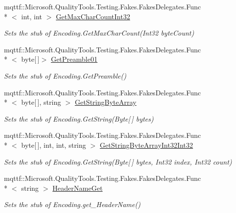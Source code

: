 \begin{DoxyCompactItemize}
mqttf\-::\-Microsoft.\-Quality\-Tools.\-Testing.\-Fakes.\-Fakes\-Delegates.\-Func\\*
$<$ int, int $>$ \hyperlink{class_system_1_1_text_1_1_fakes_1_1_stub_encoding_a3da76ffaecb1a5a18fe3c08d8bf9ca01}{Get\-Max\-Char\-Count\-Int32}
\begin{DoxyCompactList}\small\item\em Sets the stub of Encoding.\-Get\-Max\-Char\-Count(\-Int32 byte\-Count)\end{DoxyCompactList}\item 
mqttf\-::\-Microsoft.\-Quality\-Tools.\-Testing.\-Fakes.\-Fakes\-Delegates.\-Func\\*
$<$ byte\mbox{[}$\,$\mbox{]}$>$ \hyperlink{class_system_1_1_text_1_1_fakes_1_1_stub_encoding_abf888af73ec6697c5e216671d40cdae1}{Get\-Preamble01}
\begin{DoxyCompactList}\small\item\em Sets the stub of Encoding.\-Get\-Preamble()\end{DoxyCompactList}\item 
mqttf\-::\-Microsoft.\-Quality\-Tools.\-Testing.\-Fakes.\-Fakes\-Delegates.\-Func\\*
$<$ byte\mbox{[}$\,$\mbox{]}, string $>$ \hyperlink{class_system_1_1_text_1_1_fakes_1_1_stub_encoding_a08e57f47b77dc74fd63dedc5b929dc1e}{Get\-String\-Byte\-Array}
\begin{DoxyCompactList}\small\item\em Sets the stub of Encoding.\-Get\-String(\-Byte\mbox{[}$\,$\mbox{]} bytes)\end{DoxyCompactList}\item 
mqttf\-::\-Microsoft.\-Quality\-Tools.\-Testing.\-Fakes.\-Fakes\-Delegates.\-Func\\*
$<$ byte\mbox{[}$\,$\mbox{]}, int, int, string $>$ \hyperlink{class_system_1_1_text_1_1_fakes_1_1_stub_encoding_afda397423974c11f212ecbcdd58812c1}{Get\-String\-Byte\-Array\-Int32\-Int32}
\begin{DoxyCompactList}\small\item\em Sets the stub of Encoding.\-Get\-String(\-Byte\mbox{[}$\,$\mbox{]} bytes, Int32 index, Int32 count)\end{DoxyCompactList}\item 
mqttf\-::\-Microsoft.\-Quality\-Tools.\-Testing.\-Fakes.\-Fakes\-Delegates.\-Func\\*
$<$ string $>$ \hyperlink{class_system_1_1_text_1_1_fakes_1_1_stub_encoding_a43ce2beffe5ca4a9b07a07fb0e79e6b6}{Header\-Name\-Get}
\begin{DoxyCompactList}\small\item\em Sets the stub of Encoding.\-get\-\_\-\-Header\-Name()\end{DoxyCompactList}\item 

\end{DoxyCompactItemize}
